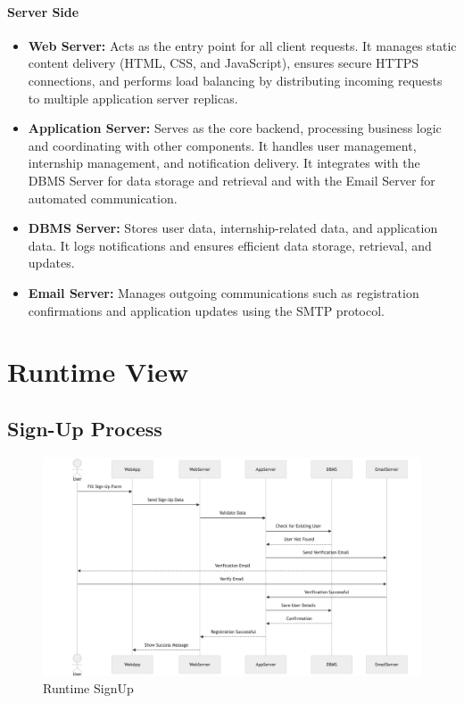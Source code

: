 \paragraph{Server Side}
\begin{itemize}
    \item \textbf{Web Server:} Acts as the entry point for all client requests. It manages static content delivery (HTML, CSS, and JavaScript), ensures secure HTTPS connections, and performs load balancing by distributing incoming requests to multiple application server replicas.
    \item \textbf{Application Server:} Serves as the core backend, processing business logic and coordinating with other components. It handles user management, internship management, and notification delivery. It integrates with the DBMS Server for data storage and retrieval and with the Email Server for automated communication.
    \item \textbf{DBMS Server:} Stores user data, internship-related data, and application data. It logs notifications and ensures efficient data storage, retrieval, and updates.
    \item \textbf{Email Server:} Manages outgoing communications such as registration confirmations and application updates using the SMTP protocol.
\end{itemize}

\section{Runtime View}
\label{sec:runtime_view}

\subsection{Sign-Up Process}
\label{subsec:signup_process}
\begin{figure}[H]
    \begin{center}
        \includegraphics[width=0.82\linewidth]{JhaBhatiaSharma/imagesDD/SignUpRuntime.png}
        \caption{Runtime SignUp}
        \label{fig:signupruntime}%
    \end{center}
\end{figure}

